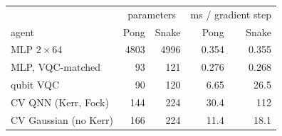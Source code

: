 \begin{tabular}{lrrrr}
\toprule
 & \multicolumn{2}{c}{parameters} & \multicolumn{2}{c}{ms / gradient step} \\
agent & Pong & Snake & Pong & Snake \\
\midrule
MLP $2\times64$ & 4803 & 4996 & 0.354 & 0.355 \\
MLP, VQC-matched & 93 & 121 & 0.276 & 0.268 \\
qubit VQC & 90 & 120 & 6.65 & 26.5 \\
CV QNN (Kerr, Fock) & 144 & 224 & 30.4 & 112 \\
CV Gaussian (no Kerr) & 166 & 224 & 11.4 & 18.1 \\
\bottomrule
\end{tabular}
